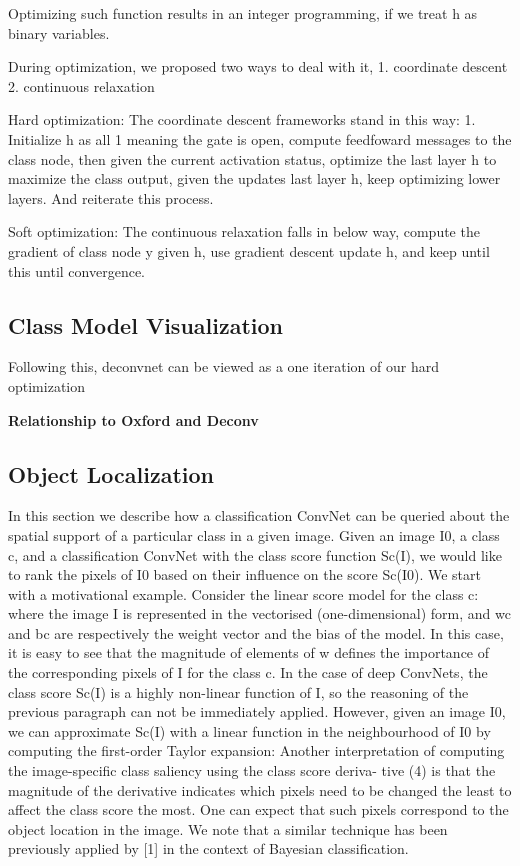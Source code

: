 Optimizing such function results in an integer programming, if we treat h as binary variables. 

During optimization, we proposed two ways to deal with it, 1. coordinate descent 2. continuous relaxation

Hard optimization: The coordinate descent frameworks stand in this way: 1. Initialize h as all 1 meaning the gate is open, compute feedfoward messages to the class node, then given the current activation status, optimize the last layer h to maximize the class output, given the updates last layer h, keep optimizing lower layers. And reiterate this process.

Soft optimization: The continuous relaxation falls in below way, compute the gradient of class node y given h, use gradient descent update h, and keep until this until convergence.

\subsection{Class Model Visualization}

Following this, deconvnet can be viewed as a one iteration of our hard optimization

\textbf{Relationship to Oxford and Deconv}

\subsection{Object Localization}

In this section we describe how a classification ConvNet can be queried about the spatial support of a particular class in a given image. Given an image I0, a class c, and a classification ConvNet with the class score function Sc(I), we would like to rank the pixels of I0 based on their influence on the score Sc(I0). 
We start with a motivational example. Consider the linear score model for the class c: 
where the image I is represented in the vectorised (one-dimensional) form, and wc and bc are respectively the weight vector and the bias of the model. In this case, it is easy to see that the magnitude of elements of w defines the importance of the corresponding pixels of I for the class c. 
In the case of deep ConvNets, the class score Sc(I) is a highly non-linear function of I, so the reasoning of the previous paragraph can not be immediately applied. However, given an image I0, we can approximate Sc(I) with a linear function in the neighbourhood of I0 by computing the first-order Taylor expansion: 
Another interpretation of computing the image-specific class saliency using the class score deriva- tive (4) is that the magnitude of the derivative indicates which pixels need to be changed the least to affect the class score the most. One can expect that such pixels correspond to the object location in the image. We note that a similar technique has been previously applied by [1] in the context of Bayesian classification. 

